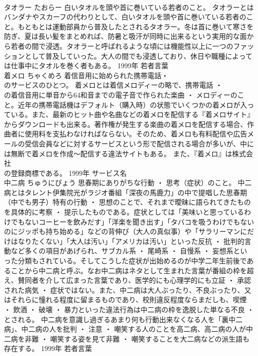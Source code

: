\documentclass[8pt]{extreport}
\begin{document}
\begin{CJK}{UTF8}{min}
\\	タオラー	たおらー	白いタオルを頭や首に巻いている若者のこと。	タオラーとはバンダナやスカーフの代わりとして、白いタオルを頭や首に巻いている若者のこと。もともとは運動部員から普及したとされるタオラー。冬は首に巻いて寒さを防ぎ、夏は長い髪をまとめれば、防暑と吸汗が同時に出来るという実用的な面から若者の間で浸透。タオラーと呼ばれるような頃には機能性以上に一つのファッションとして普及していった。大人の間でも浸透しており、休日や職種によっては仕事中にタオルを巻く者もある。	1999年	若者言葉	
\\	着メロ	ちゃくめろ	着信音用に始められた携帯電話・
\\	のサービスのひとつ。	着メロとは着信メロディーの略で、携帯電話 ・ 
\\	の着信音用に単音から64和音までの電子音で作られた楽曲 ・ メロディーのこと。近年の携帯電話機はデフォルト（購入時）の状態でいくつかの着メロが入っている。また、最新のヒット曲や名曲などの着メロを配信する『着メロサイト』からダウンロードも出来る。著作権が発生する楽曲の着メロを配信する場合、作曲者に使用料を支払わなければならない。そのため、着メロも有料配信や広告メールの受信会員などに対するサービスという形で配信される場合が多いが、中には無断で着メロを作成～配信する違法サイトもある。 また、『着メロ』は株式会社
\\	の登録商標である。	1999年	サービス名	
\\	中二病	ちゅうにびょう	思春期にありがちな行動 ・ 思考（症状）のこと。	中二病とはタレント伊集院光がラジオ番組「深夜の馬鹿力」の中で提唱した思春期（中でも男子）特有の行動 ・ 思想のことで、それまで曖昧に語られてきたものを具体的に考察 ・ 提示したものである。症状としては「美味いと思っているわけでもないコーヒーを飲みだす」「洋楽を聞き出す」「タバコを吸うわけでもないのにジッポも持ち始める」などの背伸び（大人の真似事）や「サラリーマンにだけはなりたくない」「大人は汚い」「アメリカは汚い」といった反抗 ・ 批判的言動など多くの項目があげられ、サブカル系 ・ 尾崎系 ・ 自慢系 ・ 妄想系といった分類もされている。そしてこうした症状が出始めるのが中学二年生前後であることから中二病と呼ぶ。なお中二病はネタとして生まれた言葉が番組の枠を超え、賛同者を介して広まった言葉であり、医学的にも心理学的にも立証 ・ 承認された病気 ・ 症状ではない。また、中二病は大人ぶったり、不良ぶったり、又はそれらに憧れる程度に留まるものであり、校則違反程度ならまだしも、喫煙 ・ 飲酒 ・ 破壊 ・ 暴力といった違法行為は中二病の枠を逸脱した単なる不良 ・ 
\\	とされる。 中二病を意識し過ぎるあまり何も行動出来なくなる人を「裏中二病」、中二病の人を批判 ・ 注意 ・ 嘲笑する人のことを高二病、高二病の人が中二病を非難 ・ 嘲笑する姿を見て非難 ・ 嘲笑することを大二病などの派生語も存在する。	1999年	若者言葉	

\end{CJK}
\end{document}
